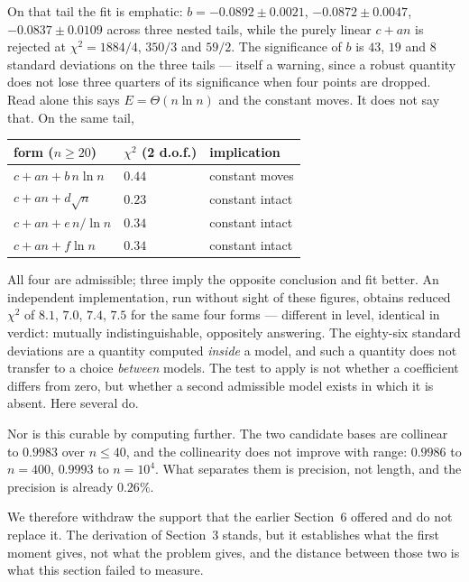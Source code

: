\documentclass[11pt,a4paper]{article}
\begin{document}
On that tail the fit is emphatic: $b=-0.0892\pm0.0021$, $-0.0872\pm0.0047$, $-0.0837\pm0.0109$
across three nested tails, while the purely linear $c+an$ is rejected at $\chi^2=1884/4$, $350/3$
and $59/2$.  The significance of $b$ is $43$, $19$ and $8$ standard deviations on the
three tails --- itself a warning, since a robust quantity does not lose three quarters of its
significance when four points are dropped.  Read alone this says $E=\Theta(n\ln n)$ and the constant
moves.  It does not say that.  On the same tail,
\begin{center}
\begin{tabular}{lll}
\toprule
form ($n\ge20$) & $\chi^2$ (2 d.o.f.) & implication\\
\midrule
$c+an+b\,n\ln n$ & $0.44$ & constant moves\\
$c+an+d\sqrt n$ & $0.23$ & constant intact\\
$c+an+e\,n/\ln n$ & $0.34$ & constant intact\\
$c+an+f\ln n$ & $0.34$ & constant intact\\
\bottomrule
\end{tabular}
\end{center}
All four are admissible; three imply the opposite conclusion and fit better.  An independent
implementation, run without sight of these figures, obtains reduced $\chi^2$ of $8.1$, $7.0$,
$7.4$, $7.5$ for the same four forms --- different in level, identical in verdict: mutually
indistinguishable, oppositely answering.  The eighty-six
standard deviations are a quantity computed \emph{inside} a model, and such a quantity does not
transfer to a choice \emph{between} models.  The test to apply is not whether a coefficient
differs from zero, but whether a second admissible model exists in which it is absent.  Here
several do.

Nor is this curable by computing further.  The two candidate bases are collinear to $0.9983$ over
$n\le40$, and the collinearity does not improve with range: $0.9986$ to $n=400$, $0.9993$ to
$n=10^4$.  What separates them is precision, not length, and the precision is already $0.26\%$.

We therefore withdraw the support that the earlier Section~6 offered and do not replace it.  The
derivation of Section~3 stands, but it establishes what the first moment gives, not what the
problem gives, and the distance between those two is what this section failed to measure.
\end{document}

